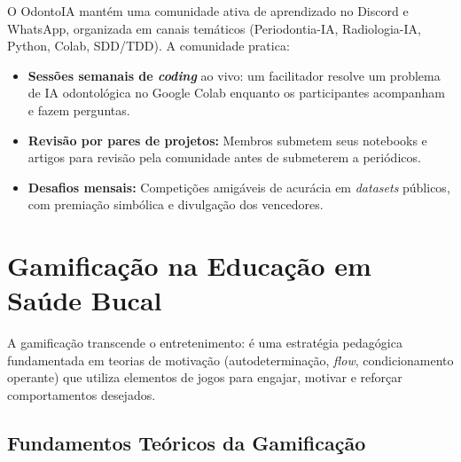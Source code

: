 O OdontoIA mantém uma comunidade ativa de aprendizado no Discord e WhatsApp,
organizada em canais temáticos (Periodontia-IA, Radiologia-IA, Python, Colab,
SDD/TDD). A comunidade pratica:

\begin{itemize}
  \item \textbf{Sessões semanais de \textit{coding}} ao vivo: um facilitador
    resolve um problema de IA odontológica no Google Colab enquanto os
    participantes acompanham e fazem perguntas.
  \item \textbf{Revisão por pares de projetos:} Membros submetem seus notebooks
    e artigos para revisão pela comunidade antes de submeterem a periódicos.
  \item \textbf{Desafios mensais:} Competições amigáveis de acurácia em
    \textit{datasets} públicos, com premiação simbólica e divulgação dos
    vencedores.
\end{itemize}

 

\section{Gamificação na Educação em Saúde Bucal}
\label{sec:gamificacao}

\nivelquatro

A gamificação transcende o entretenimento: é uma estratégia pedagógica
fundamentada em teorias de motivação (autodeterminação, \textit{flow},
condicionamento operante) que utiliza elementos de jogos para engajar,
motivar e reforçar comportamentos desejados.


\subsection{Fundamentos Teóricos da Gamificação}

